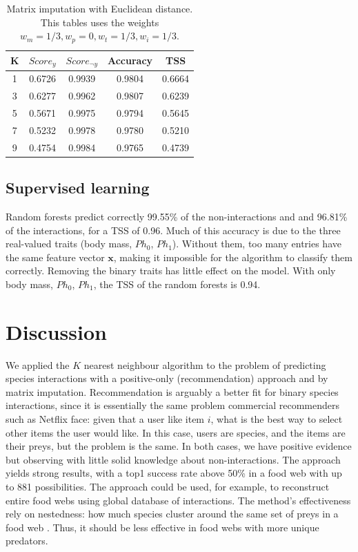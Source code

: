 \documentclass[letterpaper]{article}
\begin{document}
\begin{table}
  \centering
  \begin{tabular}{|c|cccc|}
  \hline
  K                 & $Score_y$ & $Score_{\neg y}$ & Accuracy & TSS \\
  \hline
  \hline
  1                 & 0.6726    & 0.9939            & 0.9804   & 0.6664 \\
  3                 & 0.6277    & 0.9962            & 0.9807   & 0.6239 \\
  5                 & 0.5671    & 0.9975            & 0.9794   & 0.5645 \\
  7                 & 0.5232    & 0.9978            & 0.9780   & 0.5210 \\
  9                 & 0.4754    & 0.9984            & 0.9765   & 0.4739 \\
  \hline
  \end{tabular}

  \caption{Matrix imputation with Euclidean distance. This tables uses the
  weights $w_m = 1/3, w_p = 0, w_t = 1/3, w_i = 1/3$.}

  \label{table:knn_results}
\end{table}

\subsection{Supervised learning}

Random forests predict correctly 99.55\% of the non-interactions and and
96.81\% of the interactions, for a TSS of 0.96. Much of this accuracy is due to
the three real-valued traits (body mass, $Ph_0$, $Ph_1$). Without them, too
many entries have the same feature vector $\mathbf{x}$, making it impossible
for the algorithm to classify them correctly. Removing the binary traits has
little effect on the model. With only body mass, $Ph_0$, $Ph_1$, the TSS of
the random forests is 0.94.

\section{Discussion}

We applied the $K$ nearest neighbour algorithm to the problem of predicting
species interactions with a positive-only (recommendation) approach and by
matrix imputation. Recommendation is arguably a better fit for binary species
interactions, since it is essentially the same problem commercial recommenders
such as Netflix face: given that a user like item $i$, what is the best way to
select other items the user would like. In this case, users are species, and
the items are their preys, but the problem is the same. In both cases, we have
positive evidence but observing with little solid knowledge about
non-interactions. The approach yields strong results, with a top1 success rate
above 50\% in a food web with up to 881 possibilities. The approach could be
used, for example, to reconstruct entire food webs using global database of
interactions. The method's effectiveness rely on nestedness: how much species
cluster around the same set of preys in a food web \cite{gui06}. Thus, it
should be less effective in food webs with more unique predators.
\end{document}
